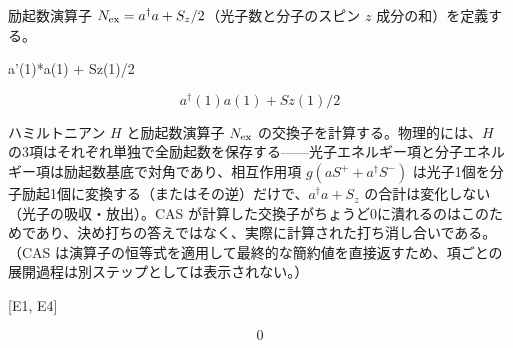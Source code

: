 \documentclass[dvipdfmx,a4paper,11pt]{jsarticle}
\begin{document}
励起数演算子 $N_{\rm ex}=a^\dagger a+S_z/2$（光子数と分子のスピン $z$ 成分の和）を定義する。

a'(1)*a(1) + Sz(1)/2

\begin{equation}
  a^{\dagger}(1) a(1) + Sz(1)/2
  \label{eq:E4}
\end{equation}

ハミルトニアン $H$ と励起数演算子 $N_{\rm ex}$ の交換子を計算する。物理的には、$H$ の3項はそれぞれ単独で全励起数を保存する——光子エネルギー項と分子エネルギー項は励起数基底で対角であり、相互作用項 $g(aS^++a^\dagger S^-)$ は光子1個を分子励起1個に変換する（またはその逆）だけで、$a^\dagger a+S_z$ の合計は変化しない（光子の吸収・放出）。CAS が計算した交換子がちょうど0に潰れるのはこのためであり、決め打ちの答えではなく、実際に計算された打ち消し合いである。（CAS は演算子の恒等式を適用して最終的な簡約値を直接返すため、項ごとの展開過程は別ステップとしては表示されない。）

[E1, E4]

\begin{equation}
  0
  \label{eq:E5}
\end{equation}
\end{document}
